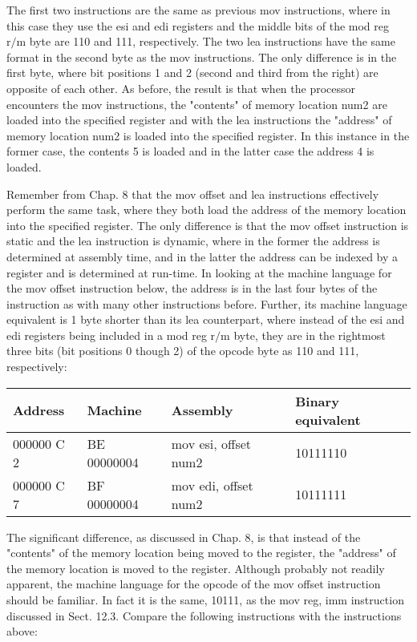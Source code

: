\documentclass[10pt]{article}
\begin{document}
The first two instructions are the same as previous mov instructions, where in this case they use the esi and edi registers and the middle bits of the mod reg $\mathrm{r} / \mathrm{m}$ byte are 110 and 111, respectively. The two lea instructions have the same format in the second byte as the mov instructions. The only difference is in the first byte, where bit positions 1 and 2 (second and third from the right) are opposite of each other. As before, the result is that when the processor encounters the mov instructions, the "contents" of memory location num2 are loaded into the specified register and with the lea instructions the "address" of memory location num2 is loaded into the specified register. In this instance in the former case, the contents 5 is loaded and in the latter case the address 4 is loaded.

Remember from Chap. 8 that the mov offset and lea instructions effectively perform the same task, where they both load the address of the memory location into the specified register. The only difference is that the mov offset instruction is static and the lea instruction is dynamic, where in the former the address is determined at assembly time, and in the latter the address can be indexed by a register and is determined at run-time. In looking at the machine language for the mov offset instruction below, the address is in the last four bytes of the instruction as with many other instructions before. Further, its machine language equivalent is 1 byte shorter than its lea counterpart, where instead of the esi and edi registers being included in a mod reg $\mathrm{r} / \mathrm{m}$ byte, they are in the rightmost three bits (bit positions 0 though 2) of the opcode byte as 110 and 111, respectively:

\begin{center}
\begin{tabular}{|l|l|l|l|}
\hline
Address & Machine & Assembly & Binary equivalent \\
\hline
000000 C 2 & BE 00000004 & mov esi, offset num2 & 10111110 \\
\hline
000000 C 7 & BF 00000004 & mov edi, offset num2 & 10111111 \\
\hline
\end{tabular}
\end{center}

The significant difference, as discussed in Chap. 8, is that instead of the "contents" of the memory location being moved to the register, the "address" of the memory location is moved to the register. Although probably not readily apparent, the machine language for the opcode of the mov offset instruction should be familiar. In fact it is the same, 10111, as the mov reg, imm instruction discussed in Sect. 12.3. Compare the following instructions with the instructions above:
\end{document}
